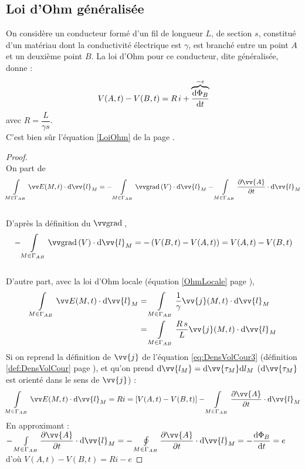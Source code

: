\documentclass[11pt,a4paper,fleqn,pdftex]{report}
\begin{document}
\subsection{Loi d'Ohm généralisée}
\begin{theorem}
On considère un conducteur formé d'un fil de longueur $L$, de section $s$, constitué d'un matériau dont la conductivité électrique est $\gamma$, est branché entre un point $A$ et un deuxième point $B$. La loi d'Ohm pour ce conducteur, dite généralisée, donne : 
\begin{equation}\label{OhmGeneral}
  V(A,t) - V(B,t) = R\, i + \overbrace{\dfrac{\mathrm{d}\Phi_B}{\mathrm{d} t}}^{-e}
\end{equation}
avec $R = \dfrac{L}{\gamma s}$.\\
C'est bien sûr l'équation \ref{LoiOhm} de la page \pageref{LoiOhm}.
\end{theorem}
%
\begin{proof} \hfill \\
On part de $$\int \limits_{M \in \Gamma_{AB}} \E (M,t) \cdot \d\vv{l}_M = -\int \limits_{M \in \Gamma_{AB}} \grad (V)\cdot \d\vv{l}_M - \int \limits_{M \in \Gamma_{AB}} \dfrac{\partial \vv{A}}{\partial t}\cdot \d\vv{l}_M$$\\ D'après la définition du $\grad $, $$-\int \limits_{M \in \Gamma_{AB}} \grad (V)\cdot \d\vv{l}_M = -\left( V(B,t) - V(A,t) \right) = V(A,t) - V(B,t)$$\\
D'autre part, avec la loi d'Ohm locale (équation \ref{OhmLocale} page \pageref{OhmLocale}), 
\begin{align*}
\int \limits_{M \in \Gamma_{AB}} \E (M,t) \cdot \d\vv{l}_M 
&= \int \limits_{M \in \Gamma_{AB}} \frac{1}{\gamma}\vv{j}(M,t) \cdot \d\vv{l}_M\\
&= \int \limits_{M \in \Gamma_{AB}} \dfrac{R\, s}{L}\vv{j}(M,t) \cdot \d\vv{l}_M\\
\end{align*}
Si on reprend la définition de $\vv{j}$ de l'équation \eqref{eq:DensVolCour3} (définition \ref{def:DensVolCour} page \pageref{eq:DensVolCour3}), et qu'on prend $\d\vv{l_M}=\d\vv{\tau_M}\d l_M$ ($\d\vv{\tau_M}$ est orienté dans le sens de $\vv{j}$) : 
$$
\int \limits_{M \in \Gamma_{AB}} \E (M,t) \cdot \d\vv{l}_M 
= Ri= \left[ V(A,t) - V(B,t) \right] - \int \limits_{M \in \Gamma_{AB}} \dfrac{\partial \vv{A}}{\partial t}\cdot \d\vv{l}_M
$$
En approximant : $- \int \limits_{M \in \Gamma_{AB}} \dfrac{\partial \vv{A}}{\partial t}\cdot \d\vv{l}_M = - \oint \limits_{M \in \Gamma_{AB}} \dfrac{\partial \vv{A}}{\partial t}\cdot \d\vv{l}_M=-\dfrac{\d\Phi_B}{\d t}=e$
d'où $V(A,t) - V(B,t)= Ri - e$
\end{proof}
\end{document}

